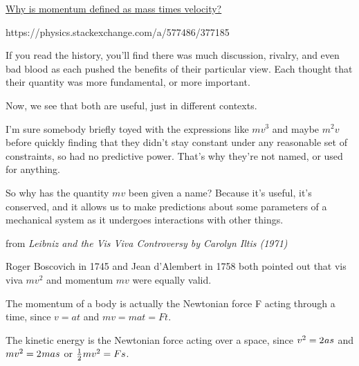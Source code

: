 \href{https://physics.stackexchange.com/questions/577332/why-is-momentum-defined-as-mass-times-velocity}{Why is momentum defined as mass times velocity?}

{\small

https://physics.stackexchange.com/a/577486/377185

If you read the history, you’ll find there was much discussion, rivalry, and even bad blood as each pushed the benefits of their particular view. Each thought that their quantity was more fundamental, or more important.

Now, we see that both are useful, just in different contexts.

I’m sure somebody briefly toyed with the expressions like ${m v^3}$ and maybe ${m^2 v}$ before quickly finding that they didn’t stay constant under any reasonable set of constraints, so had no predictive power. That’s why they’re not named, or used for anything.

So why has the quantity ${m v}$ been given a name? Because it’s useful, it’s conserved, and it allows us to make predictions about some parameters of a mechanical system as it undergoes interactions with other things.

\par}

from \emph{Leibniz and the Vis Viva Controversy by Carolyn Iltis (1971)}

Roger Boscovich in 1745 and Jean d’Alembert in 1758 both pointed out that vis viva ${mv^2}$ and momentum ${mv}$ were equally valid.

The momentum of a body is actually the Newtonian force F acting through a time, since ${v = at}$ and ${mv = mat = Ft}$.

The kinetic energy is the Newtonian force acting over a space, since ${v^2 = 2 \hspace{.1ex} as}$ and ${mv^2 = 2 \hspace{.1ex} mas}$ or ${\frac{1}{2} \hspace{.1ex} mv^2 = Fs}$.

